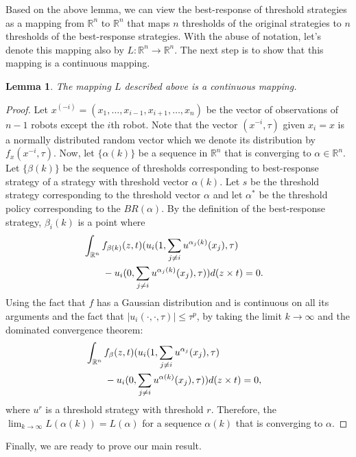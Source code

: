 \documentclass[conference]{ieeeconf}
\newtheorem{lemma}{Lemma}
\def\R{\mathbb{R}}
\begin{document}
Based on the above lemma, we can view the best-response of threshold strategies as a mapping from $\R^n$ to $\R^n$ that maps $n$ thresholds of the original strategies to $n$ thresholds of the best-response strategies. With the abuse of notation, let's denote this mapping also by $L:\R^n\to\R^n$. The next step is to show that this mapping is a continuous mapping. 
\begin{lemma}\label{lemma:continuous}
The mapping $L$ described above is a continuous mapping. 
\end{lemma}
\begin{proof}
Let $x^{(-i)}=(x_1,\ldots,x_{i-1},x_{i+1},\ldots,x_n)$ be the vector of observations of $n-1$ robots except the $i$th robot. Note that the vector $(x^{-i},\tau)$ given $x_i=x$ is a normally distributed random vector which we denote its distribution by $f_{x}(x^{-i},\tau)$. Now, let $\{\alpha(k)\}$ be a sequence in $\R^n$ that is converging to $\alpha\in\R^n$. Let $\{\beta(k)\}$ be the sequence of thresholds corresponding to best-response strategy of a strategy with threshold vector $\alpha(k)$. Let $s$ be the threshold strategy corresponding to the threshold vector $\alpha$ and let $\alpha^*$ be the threshold policy corresponding to the $BR(\alpha)$. By the definition of the best-response strategy, $\beta_i(k)$ is a point where 
\begin{align}
&\int_{\R^{n}}f_{\beta(k)}(z,t)(u_i(1,\sum_{j\not=i}u^{\alpha_j(k)}(x_j),\tau)\cr 
&\qquad-u_i(0,\sum_{j\not=i}u^{\alpha_j(k)}(x_j),\tau))d(z\times t)=0.
\end{align}
Using the fact that $f$ has a Gaussian distribution and is continuous on all its arguments and the fact that $|u_i(\cdot,\cdot,\tau)|\leq \tau^p$, by taking the limit $k\to\infty$ and the dominated convergence theorem:
\begin{align}
&\int_{\R^{n}}f_{\beta}(z,t)(u_i(1,\sum_{j\not=i}u^{\alpha_j}(x_j),\tau)\cr 
&\qquad-u_i(0,\sum_{j\not=i}u^{\alpha(k)}(x_j),\tau))d(z\times t)=0,
\end{align}
where $u^{r}$ is a threshold strategy with threshold $r$. Therefore, the $\lim_{k\to\infty}L(\alpha(k))=L(\alpha)$ for a sequence $\alpha(k)$ that is converging to $\alpha$.
\end{proof}
Finally, we are ready to prove our main result. 
\end{document}
